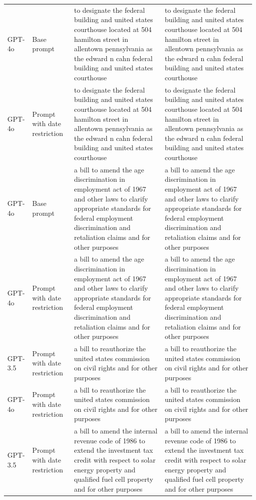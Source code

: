 \begin{longtable}{>{\raggedright\arraybackslash}p{1.4cm}>{\raggedright\arraybackslash}p{1.4cm}>{\raggedright\arraybackslash}p{5.5cm}>{\raggedright\arraybackslash}p{5.5cm}}
GPT-4o & Base prompt & to designate the federal building and united states courthouse located at 504 hamilton street in allentown pennsylvania as the edward n cahn federal building and united states courthouse & to designate the federal building and united states courthouse located at 504 hamilton street in allentown pennsylvania as the edward n cahn federal building and united states courthouse\\
GPT-4o & Prompt with date restriction & to designate the federal building and united states courthouse located at 504 hamilton street in allentown pennsylvania as the edward n cahn federal building and united states courthouse & to designate the federal building and united states courthouse located at 504 hamilton street in allentown pennsylvania as the edward n cahn federal building and united states courthouse\\
GPT-4o & Base prompt & a bill to amend the age discrimination in employment act of 1967 and other laws to clarify appropriate standards for federal employment discrimination and retaliation claims and for other purposes & a bill to amend the age discrimination in employment act of 1967 and other laws to clarify appropriate standards for federal employment discrimination and retaliation claims and for other purposes\\
GPT-4o & Prompt with date restriction & a bill to amend the age discrimination in employment act of 1967 and other laws to clarify appropriate standards for federal employment discrimination and retaliation claims and for other purposes & a bill to amend the age discrimination in employment act of 1967 and other laws to clarify appropriate standards for federal employment discrimination and retaliation claims and for other purposes\\
GPT-3.5 & Prompt with date restriction & a bill to reauthorize the united states commission on civil rights and for other purposes & a bill to reauthorize the united states commission on civil rights and for other purposes\\
GPT-4o & Prompt with date restriction & a bill to reauthorize the united states commission on civil rights and for other purposes & a bill to reauthorize the united states commission on civil rights and for other purposes\\
GPT-3.5 & Prompt with date restriction & a bill to amend the internal revenue code of 1986 to extend the investment tax credit with respect to solar energy property and qualified fuel cell property and for other purposes & a bill to amend the internal revenue code of 1986 to extend the investment tax credit with respect to solar energy property and qualified fuel cell property and for other purposes\\

\end{longtable}
